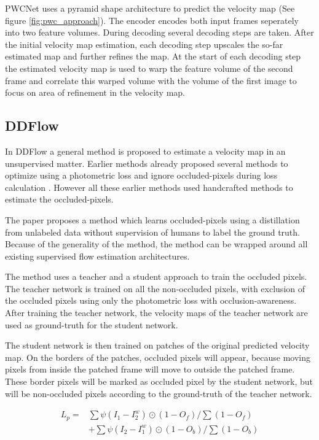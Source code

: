 PWCNet uses a pyramid shape architecture to predict the velocity map (See figure \ref{fig:pwc_approach}). The encoder encodes both input frames seperately into two feature volumes. During decoding several decoding steps are taken. After the initial velocity map estimation, each decoding step upscales the so-far estimated map and further refines the map. At the start of each decoding step the estimated velocity map is used to warp the feature volume of the second frame and correlate this warped volume with the volume of the first image to focus on area of refinement in the velocity map.

\subsection{DDFlow}
In DDFlow \cite{liu_ddflow_2019} a general method is proposed to estimate a velocity map in an unsupervised matter. Earlier methods already proposed several methods to optimize using a photometric loss \cite{Yu2016} and ignore occluded-pixels during loss calculation \cite{Janai2018}. However all these earlier methods used handcrafted methods to estimate the occluded-pixels.

The paper \cite{liu_ddflow_2019} proposes a method which learns occluded-pixels using a distillation from unlabeled data without supervision of humans to label the ground truth. Because of the generality of the method, the method can be wrapped around all existing supervised flow estimation architectures.

The method uses a teacher and a student approach to train the occluded pixels. The teacher network is trained on all the non-occluded pixels, with exclusion of the occluded pixels using only the photometric loss with occlusion-awareness. After training the teacher network, the velocity maps of the teacher network are used as ground-truth for the student network.

The student network is then trained on patches of the original predicted velocity map. On the borders of the patches, occluded pixels will appear, because moving pixels from inside the patched frame will move to outside the patched frame. These border pixels will be marked as occluded pixel by the student network, but will be non-occluded pixels according to the ground-truth of the teacher network.

\begin{equation}
\begin{aligned}
L_{p}=& \sum \psi\left(I_{1}-I_{2}^{w}\right) \odot\left(1-O_{f}\right) / \sum\left(1-O_{f}\right) \\
&+\sum \psi\left(I_{2}-I_{1}^{w}\right) \odot\left(1-O_{b}\right) / \sum\left(1-O_{b}\right)
\end{aligned}
\label{eq:photometric_loss}
\end{equation}

